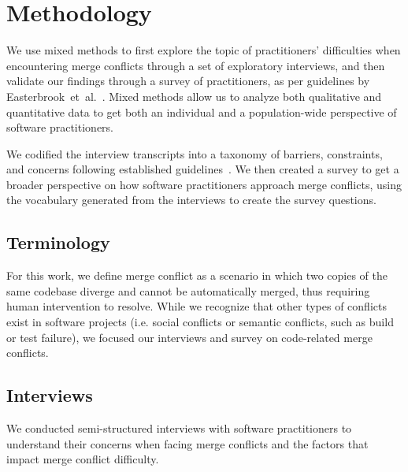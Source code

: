 
\section{Methodology}\label{methodology}

We use mixed methods to first explore the topic of practitioners' difficulties when encountering merge conflicts through a set of exploratory interviews, and then validate our findings through a survey of practitioners, as per guidelines by \mbox{Easterbrook et al.}~\cite{easterbrook2008selecting}.
Mixed methods allow us to analyze both qualitative and quantitative data to get both an individual and a population-wide perspective of software practitioners.

We codified the interview transcripts into a taxonomy of barriers, constraints, and concerns following established guidelines~\cite{latoza2006maintaining, shull2008guide, tao2012software}.
We then created a survey to get a broader perspective on how software practitioners approach merge conflicts, using the vocabulary generated from the interviews to create the survey questions.

\subsection{Terminology}\label{terminology_methods}
For this work, we define merge conflict as a scenario in which two copies of the same codebase diverge and cannot be automatically merged, thus requiring human intervention to resolve. 
While we recognize that other types of conflicts exist in software projects (i.e. social conflicts or semantic conflicts, such as build or test failure), we focused our interviews and survey on code-related merge conflicts.

\subsection{Interviews}\label{interview_methods}

We conducted semi-structured interviews with software practitioners to understand their concerns when facing merge conflicts and the factors that impact merge conflict difficulty.


